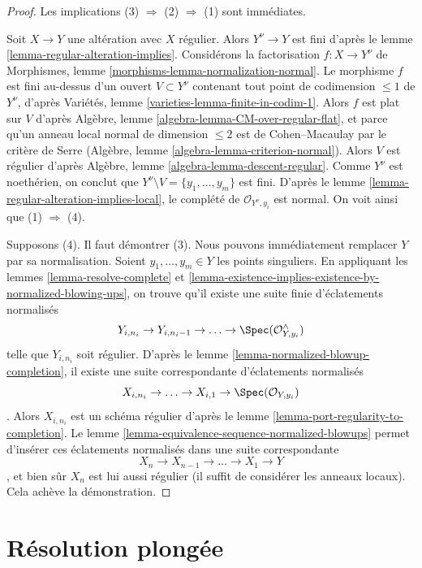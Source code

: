 \begin{proof} Les implications (3) $\Rightarrow$ (2) $\Rightarrow$ (1) sont immédiates.

\medskip\noindent Soit $X \to Y$ une altération avec $X$ régulier. Alors $Y^\nu \to Y$ est fini d'après le lemme \ref{lemma-regular-alteration-implies}. Considérons la factorisation $f : X \to Y^\nu$ de Morphismes, lemme \ref{morphisms-lemma-normalization-normal}. Le morphisme $f$ est fini au-dessus d'un ouvert $V \subset Y^\nu$ contenant tout point de codimension $\leq 1$ de $Y^\nu$, d'après Variétés, lemme \ref{varieties-lemma-finite-in-codim-1}. Alors $f$ est plat sur $V$ d'après Algèbre, lemme \ref{algebra-lemma-CM-over-regular-flat}, et parce qu'un anneau local normal de dimension $\leq 2$ est de Cohen--Macaulay par le critère de Serre (Algèbre, lemme \ref{algebra-lemma-criterion-normal}). Alors $V$ est régulier d'après Algèbre, lemme \ref{algebra-lemma-descent-regular}. Comme $Y^\nu$ est noethérien, on conclut que $Y^\nu \setminus V = \{y_1, \ldots, y_m\}$ est fini. D'après le lemme \ref{lemma-regular-alteration-implies-local}, le complété de $\mathcal{O}_{Y^\nu, y_i}$ est normal. On voit ainsi que (1) $\Rightarrow$ (4).

\medskip\noindent Supposons (4). Il faut démontrer (3). Nous pouvons immédiatement remplacer $Y$ par sa normalisation. Soient $y_1, \ldots, y_m \in Y$ les points singuliers. En appliquant les lemmes \ref{lemma-resolve-complete} et \ref{lemma-existence-implies-existence-by-normalized-blowing-ups}, on trouve qu'il existe une suite finie d'éclatements normalisés $$
Y_{i, n_i} \to Y_{i, n_i - 1} \to \ldots \to \Spec(\mathcal{O}^\wedge_{Y, y_i})
$$ telle que $Y_{i, n_i}$ soit régulier. D'après le lemme \ref{lemma-normalized-blowup-completion}, il existe une suite correspondante d'éclatements normalisés $$
X_{i, n_i} \to \ldots \to X_{i, 1} \to \Spec(\mathcal{O}_{Y, y_i})
$$. Alors $X_{i, n_i}$ est un schéma régulier d'après le lemme \ref{lemma-port-regularity-to-completion}. Le lemme \ref{lemma-equivalence-sequence-normalized-blowups} permet d'insérer ces éclatements normalisés dans une suite correspondante $$
X_n \to X_{n - 1} \to \ldots \to X_1 \to Y
$$, et bien sûr $X_n$ est lui aussi régulier (il suffit de considérer les anneaux locaux). Cela achève la démonstration. \end{proof}






\section{Résolution plongée} \label{section-embedded}

